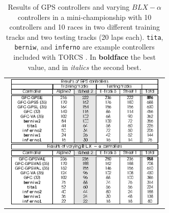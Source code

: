 \documentclass[10pt,journal,compsoc]{IEEEtran}
\begin{document}
\begin{table}[h!]
	\centering
	{\scriptsize
		\caption{{\scriptsize Results of GPS controllers and varying $BLX-\alpha$ controllers in a mini-championship with 10 controllers and 10 races in two different training tracks and two testing tracks (20 laps each). {\tt tita}, {\tt berniw}, and {\tt	inferno} are example controllers included with TORCS \cite{torcs4}. In {\bf boldface} the best value, and in {\em italics} the second best.}}
		{
						\begin{tabular}{c}
				\includegraphics[width=8cm, height=6.5cm, clip=true, trim=0cm 0cm 0cm 0cm]{fig/table3.eps} 
%                    
%			
%			
%
%
%

\end{tabular}}}
\end{table}
\end{document}
